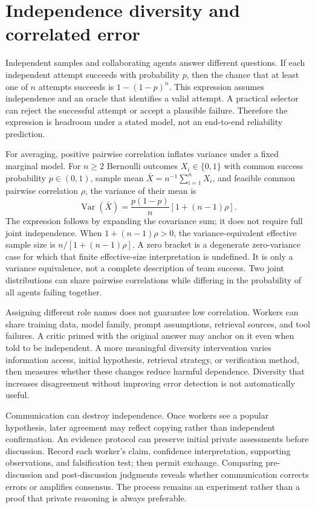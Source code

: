 \section{Independence diversity and correlated error}\label{sec:C21:dependence}
Independent samples and collaborating agents answer different questions. If each independent attempt succeeds with probability $p$, then the chance that at least one of $n$ attempts succeeds is $1-(1-p)^n$. This expression assumes independence and an oracle that identifies a valid attempt. A practical selector can reject the successful attempt or accept a plausible failure. Therefore the expression is headroom under a stated model, not an end-to-end reliability prediction.

For averaging, positive pairwise correlation inflates variance under a fixed marginal model. For $n\geq2$ Bernoulli outcomes $X_i\in\{0,1\}$ with common success probability $p\in(0,1)$, sample mean $\bar X=n^{-1}\sum_{i=1}^nX_i$, and feasible common pairwise correlation $\rho$, the variance of their mean is
\begin{equation}
 \operatorname{Var}(\bar X)=\frac{p(1-p)}{n}
 \left[1+(n-1)\rho\right].
\end{equation}
The expression follows by expanding the covariance sum; it does not require full joint independence. When $1+(n-1)\rho>0$, the variance-equivalent effective sample size is $n/[1+(n-1)\rho]$. A zero bracket is a degenerate zero-variance case for which that finite effective-size interpretation is undefined. It is only a variance equivalence, not a complete description of team success. Two joint distributions can share pairwise correlations while differing in the probability of all agents failing together.

Assigning different role names does not guarantee low correlation. Workers can share training data, model family, prompt assumptions, retrieval sources, and tool failures. A critic primed with the original answer may anchor on it even when told to be independent. A more meaningful diversity intervention varies information access, initial hypothesis, retrieval strategy, or verification method, then measures whether these changes reduce harmful dependence. Diversity that increases disagreement without improving error detection is not automatically useful.

Communication can destroy independence. Once workers see a popular hypothesis, later agreement may reflect copying rather than independent confirmation. An evidence protocol can preserve initial private assessments before discussion. Record each worker's claim, confidence interpretation, supporting observations, and falsification test; then permit exchange. Comparing pre-discussion and post-discussion judgments reveals whether communication corrects errors or amplifies consensus. The process remains an experiment rather than a proof that private reasoning is always preferable.

